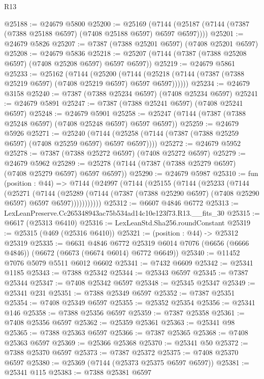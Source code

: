 \begin{lexlean}{R13}
\begin{coremodule}
@25188 := @24679 @5800
@25200 := @25169
    (@7144 (@25187 (@7144 (@7387 (@7388 @25188 @6597) (@7408 @25188 @6597) @6597 @6597))))
@25201 := @24679 @5826
@25207 := @7387 (@7388 @25201 @6597) (@7408 @25201 @6597)
@25208 := @24679 @5836
@25218 := @25207 (@7144 (@7387 (@7388 @25208 @6597) (@7408 @25208 @6597) @6597 @6597))
@25219 := @24679 @5861
@25233 := @25162
    (@7144
      (@25200
        (@7144 (@25218 (@7144 (@7387 (@7388 @25219 @6597) (@7408 @25219 @6597) @6597 @6597))))))
@25234 := @24679 @3158
@25240 := @7387 (@7388 @25234 @6597) (@7408 @25234 @6597)
@25241 := @24679 @5891
@25247 := @7387 (@7388 @25241 @6597) (@7408 @25241 @6597)
@25248 := @24679 @5901
@25258 := @25247 (@7144 (@7387 (@7388 @25248 @6597) (@7408 @25248 @6597) @6597 @6597))
@25259 := @24679 @5926
@25271 := @25240
    (@7144 (@25258 (@7144 (@7387 (@7388 @25259 @6597) (@7408 @25259 @6597) @6597 @6597))))
@25272 := @24679 @5952
@25278 := @7387 (@7388 @25272 @6597) (@7408 @25272 @6597)
@25279 := @24679 @5962
@25289 := @25278 (@7144 (@7387 (@7388 @25279 @6597) (@7408 @25279 @6597) @6597 @6597))
@25290 := @24679 @5987
@25310 := fun (position : @44) =>
  @7144
    (@24997
      (@7144
        (@25155
          (@7144
            (@25233
              (@7144
                (@25271
                  (@7144
                    (@25289
                      (@7144 (@7387 (@7388 @25290 @6597) (@7408 @25290 @6597) @6597 @6597)))))))))))
@25312 := @6607 @4846 @6772
@25313 := LexLeanPreserve.Cc265348943ac75b534ad14c10e123f73.R13.__fits_30
@25315 := @6617 (@25313 @6410)
@25316 := LexLeanStd.Sha256.roundConstant
@25319 := @25315 (@469 (@25316 @6410))
@25321 := (position : @44) -> @25312 @25319
@25335 := @6631
    @4846
    @6772
    @25319
    @6014
    @7076
    (@6656 (@6666 @4846))
    (@6672 (@6673 (@6674 @6014) @6772 @6649))
@25340 := @11452 @7076 @5079 @5511 @6012 @6602
@25341 := @7432 @6609
@25342 := @25341 @1185
@25343 := @7388 @25342
@25344 := @25343 @6597
@25345 := @7387 @25344
@25347 := @7408 @25342 @6597
@25348 := @25345 @25347
@25349 := @25341 @231
@25351 := @7388 @25349 @6597
@25352 := @7387 @25351
@25354 := @7408 @25349 @6597
@25355 := @25352 @25354
@25356 := @25341 @146
@25358 := @7388 @25356 @6597
@25359 := @7387 @25358
@25361 := @7408 @25356 @6597
@25362 := @25359 @25361
@25363 := @25341 @98
@25365 := @7388 @25363 @6597
@25366 := @7387 @25365
@25368 := @7408 @25363 @6597
@25369 := @25366 @25368
@25370 := @25341 @50
@25372 := @7388 @25370 @6597
@25373 := @7387 @25372
@25375 := @7408 @25370 @6597
@25380 := @25369 (@7144 (@25373 @25375 @6597 @6597))
@25381 := @25341 @115
@25383 := @7388 @25381 @6597

\end{coremodule}
\end{lexlean}
